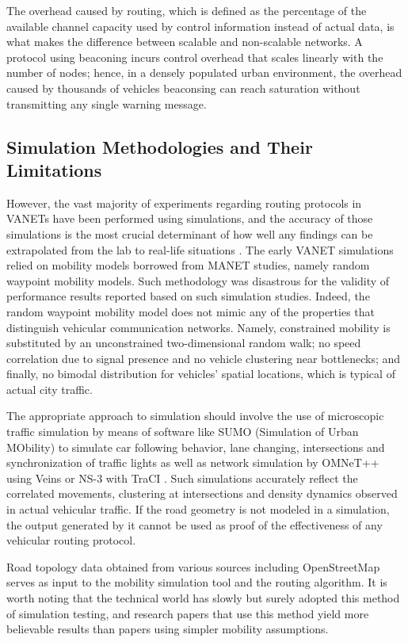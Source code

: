 \documentclass[12pt]{article}
\begin{document}
The overhead caused by routing, which is defined as the percentage of the available channel capacity used by control information instead of actual data, is what makes the difference between scalable and non-scalable networks. A protocol using beaconing incurs control overhead that scales linearly with the number of nodes; hence, in a densely populated urban environment, the overhead caused by thousands of vehicles beaconsing can reach saturation without transmitting any single warning message.

\subsection{Simulation Methodologies and Their Limitations}

However, the vast majority of experiments regarding routing protocols in VANETs have been performed using simulations, and the accuracy of those simulations is the most crucial determinant of how well any findings can be extrapolated from the lab to real-life situations \cite{sommer2008progressing}.
The early VANET simulations relied on mobility models borrowed from MANET studies, namely random waypoint mobility models. Such methodology was disastrous for the validity of performance results reported based on such simulation studies. Indeed, the random waypoint mobility model does not mimic any of the properties that distinguish vehicular communication networks. Namely, constrained mobility is substituted by an unconstrained two-dimensional random walk; no speed correlation due to signal presence and no vehicle clustering near bottlenecks; and finally, no bimodal distribution for vehicles' spatial locations, which is typical of actual city traffic.

The appropriate approach to simulation should involve the use of microscopic traffic simulation by means of software like SUMO (Simulation of Urban MObility) to simulate car following behavior, lane changing, intersections and synchronization of traffic lights as well as network simulation by OMNeT++ using Veins or NS-3 with TraCI \cite{nzouonta2009vanet}. Such simulations accurately reflect the correlated movements, clustering at intersections and density dynamics observed in actual vehicular traffic. If the road geometry is not modeled in a simulation, the output generated by it cannot be used as proof of the effectiveness of any vehicular routing protocol.

Road topology data obtained from various sources including OpenStreetMap serves as input to the mobility simulation tool and the routing algorithm. It is worth noting that the technical world has slowly but surely adopted this method of simulation testing, and research papers that use this method yield more believable results than papers using simpler mobility assumptions.
\end{document}

